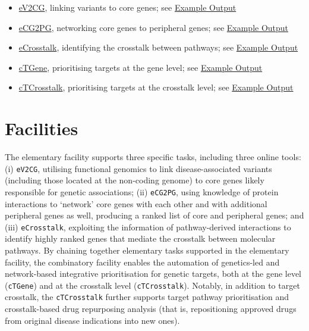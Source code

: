 \documentclass[
  oneside]{book}
\begin{document}
\begin{itemize}
\item
  \protect\hyperlink{ev2cg}{eV2CG}, linking variants to core genes; see \href{/app/examples/_tmp_RMD_eV2CG.html}{Example Output}
\item
  \protect\hyperlink{ecg2pg}{eCG2PG}, networking core genes to peripheral genes; see \href{/app/examples/_tmp_RMD_eCG2PG.html}{Example Output}
\item
  \protect\hyperlink{ecrosstalk}{eCrosstalk}, identifying the crosstalk between pathways; see \href{/app/examples/_tmp_RMD_eCrosstalk.html}{Example Output}
\item
  \protect\hyperlink{ctgene}{cTGene}, prioritising targets at the gene level; see \href{/app/examples/_tmp_RMD_cTGene.html}{Example Output}
\item
  \protect\hyperlink{ctcrosstalk}{cTCrosstalk}, prioritising targets at the crosstalk level; see \href{/app/examples/_tmp_RMD_cTCrosstalk.html}{Example Output}
\end{itemize}

\hypertarget{facilities}{%
\chapter{Facilities}\label{facilities}}

The elementary facility supports three specific tasks, including three online tools: (i) \texttt{eV2CG}, utilising functional genomics to link disease-associated variants (including those located at the non-coding genome) to core genes likely responsible for genetic associations; (ii) \texttt{eCG2PG}, using knowledge of protein interactions to `network' core genes with each other and with additional peripheral genes as well, producing a ranked list of core and peripheral genes; and (iii) \texttt{eCrosstalk}, exploiting the information of pathway-derived interactions to identify highly ranked genes that mediate the crosstalk between molecular pathways. By chaining together elementary tasks supported in the elementary facility, the combinatory facility enables the automation of genetics-led and network-based integrative prioritisation for genetic targets, both at the gene level (\texttt{cTGene}) and at the crosstalk level (\texttt{cTCrosstalk}). Notably, in addition to target crosstalk, the \texttt{cTCrosstalk} further supports target pathway prioritisation and crosstalk-based drug repurposing analysis (that is, repositioning approved drugs from original disease indications into new ones).
\end{document}
